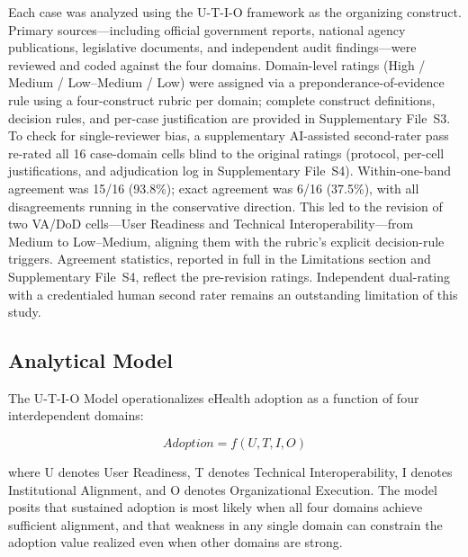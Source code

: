 Each case was analyzed using the U-T-I-O framework as the organizing construct. Primary sources—including official government reports, national agency publications, legislative documents, and independent audit findings—were reviewed and coded against the four domains. Domain-level ratings (High / Medium / Low--Medium / Low) were assigned via a preponderance-of-evidence rule using a four-construct rubric per domain; complete construct definitions, decision rules, and per-case justification are provided in Supplementary File~S3. To check for single-reviewer bias, a supplementary AI-assisted second-rater pass re-rated all 16 case-domain cells blind to the original ratings (protocol, per-cell justifications, and adjudication log in Supplementary File~S4). Within-one-band agreement was 15/16 (93.8\%); exact agreement was 6/16 (37.5\%), with all disagreements running in the conservative direction. This led to the revision of two VA/DoD cells—User Readiness and Technical Interoperability—from Medium to Low--Medium, aligning them with the rubric's explicit decision-rule triggers. Agreement statistics, reported in full in the Limitations section and Supplementary File~S4, reflect the pre-revision ratings. Independent dual-rating with a credentialed human second rater remains an outstanding limitation of this study.

\subsection{Analytical Model}

The U-T-I-O Model operationalizes eHealth adoption as a function of four interdependent domains:

\begin{equation}
Adoption = f(U, T, I, O)
\end{equation}

where U denotes User Readiness, T denotes Technical Interoperability, I denotes Institutional Alignment, and O denotes Organizational Execution. The model posits that sustained adoption is most likely when all four domains achieve sufficient alignment, and that weakness in any single domain can constrain the adoption value realized even when other domains are strong.
